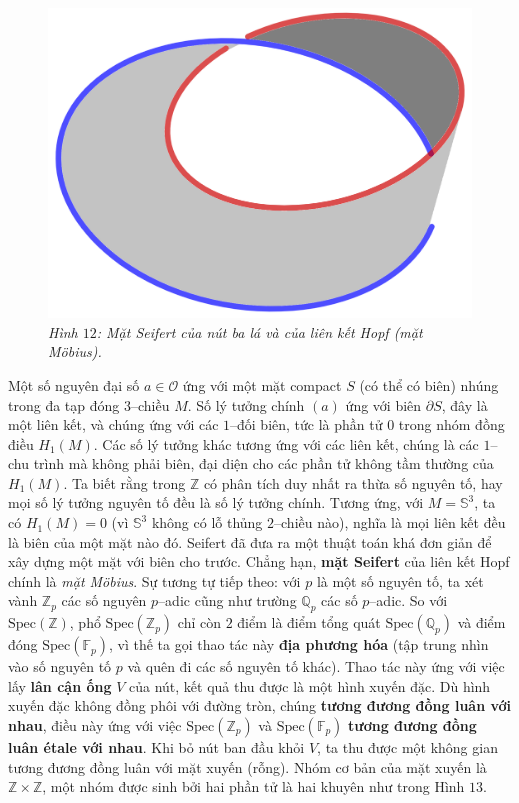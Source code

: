 \begin{multicols}{2}
\begin{figure}[H]
		\includegraphics[width= 0.42\linewidth]{seifert2}
		\caption{\small\textit{\color{duongvaotoanhoc}Hình $12$: Mặt Seifert của nút ba lá và của liên kết Hopf (mặt M\"obius).}}
		\vspace*{-10pt}
	\end{figure}
	Một số nguyên đại số $a \in \mathcal{O}$ ứng với một mặt compact $S$ (có thể có biên) nhúng trong đa tạp đóng $3$--chiều $M$. Số lý tưởng chính $(a)$ ứng với biên $\partial S$, đây là một liên kết, và chúng ứng với các $1$--đối biên, tức là phần tử $0$ trong nhóm đồng điều $H_1(M)$. Các số lý tưởng khác tương ứng với các liên kết, chúng là các $1$--chu trình mà không phải biên, đại diện cho các phần tử không tầm thường của $H_1(M)$. Ta biết rằng trong $\mathbb{Z}$ có phân tích duy nhất ra thừa số nguyên tố, hay mọi số lý tưởng nguyên tố đều là số lý tưởng chính. Tương ứng, với $M = \mathbb{S}^3$, ta có $H_1(M) = 0$ (vì $\mathbb{S}^3$ không có lỗ thủng $2$--chiều nào), nghĩa là mọi liên kết đều là biên của một mặt nào đó. Seifert đã đưa ra một thuật toán khá đơn giản để xây dựng một mặt với biên cho trước. Chẳng hạn, {\bf\color{duongvaotoanhoc} mặt Seifert} của liên kết Hopf chính là {\it mặt M\"obius}.
	\vskip 0.1cm
	Sự tương tự tiếp theo: với $p$ là một số nguyên tố, ta xét vành $\mathbb{Z}_p$ các số nguyên $p$--adic cũng như trường $\mathbb{Q}_p$ các số $p$--adic. So với $\text{Spec}(\mathbb{Z})$, phổ $\text{Spec}(\mathbb{Z}_p)$ chỉ còn $2$ điểm là điểm tổng quát $\text{Spec}(\mathbb{Q}_p)$ và điểm đóng $\text{Spec}(\mathbb{F}_p)$, vì thế ta gọi thao tác này {\bf\color{duongvaotoanhoc} địa phương hóa} (tập trung nhìn vào số nguyên tố $p$ và quên đi các số nguyên tố khác). Thao tác này ứng với việc lấy {\bf\color{duongvaotoanhoc} lân cận ống} $V$ của nút, kết quả thu được là một hình xuyến đặc. Dù hình xuyến đặc không đồng phôi với đường tròn, chúng {\bf\color{duongvaotoanhoc} tương đương đồng luân với nhau}, điều này ứng với việc $\text{Spec}(\mathbb{Z}_p)$ và $\text{Spec}(\mathbb{F}_p)$ {\bf\color{duongvaotoanhoc} tương đương đồng luân étale với nhau}. Khi bỏ nút ban đầu khỏi $V$, ta thu được một không gian tương đương đồng luân với mặt xuyến (rỗng). Nhóm cơ bản của mặt xuyến là $\mathbb{Z} \times \mathbb{Z}$, một nhóm được sinh bởi hai phần tử là hai khuyên như trong Hình $13$.

\end{multicols}
